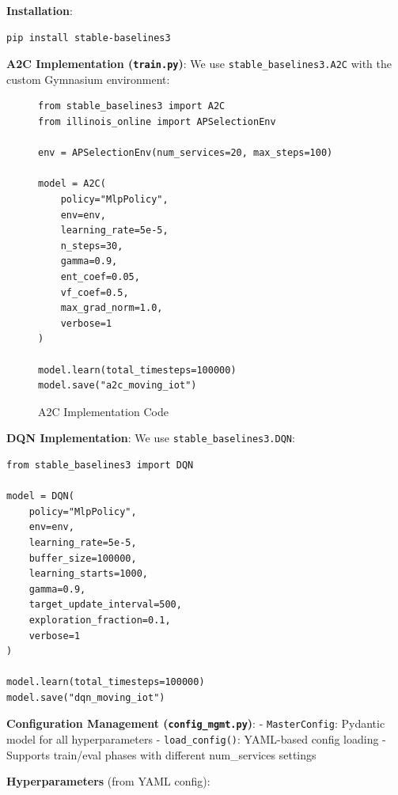 \textbf{Installation}:

\begin{verbatim}
pip install stable-baselines3
\end{verbatim}

\textbf{A2C Implementation (\texttt{train.py})}: We use
\texttt{stable\_baselines3.A2C} with the custom Gymnasium environment:

\begin{figure}[t]
	\centering
	\caption{A2C Implementation Code}
	\label{a2c-implementation-code}
	\scriptsize
	\begin{verbatim}
from stable_baselines3 import A2C
from illinois_online import APSelectionEnv

env = APSelectionEnv(num_services=20, max_steps=100)

model = A2C(
    policy="MlpPolicy",
    env=env,
    learning_rate=5e-5,
    n_steps=30,
    gamma=0.9,
    ent_coef=0.05,
    vf_coef=0.5,
    max_grad_norm=1.0,
    verbose=1
)

model.learn(total_timesteps=100000)
model.save("a2c_moving_iot")
	\end{verbatim}
\end{figure}

\textbf{DQN Implementation}: We use \texttt{stable\_baselines3.DQN}:

\begin{verbatim}
from stable_baselines3 import DQN

model = DQN(
    policy="MlpPolicy",
    env=env,
    learning_rate=5e-5,
    buffer_size=100000,
    learning_starts=1000,
    gamma=0.9,
    target_update_interval=500,
    exploration_fraction=0.1,
    verbose=1
)

model.learn(total_timesteps=100000)
model.save("dqn_moving_iot")
\end{verbatim}

\textbf{Configuration Management (\texttt{config\_mgmt.py})}: -
\texttt{MasterConfig}: Pydantic model for all hyperparameters -
\texttt{load\_config()}: YAML-based config loading - Supports train/eval
phases with different num\_services settings

\textbf{Hyperparameters} (from YAML config):

